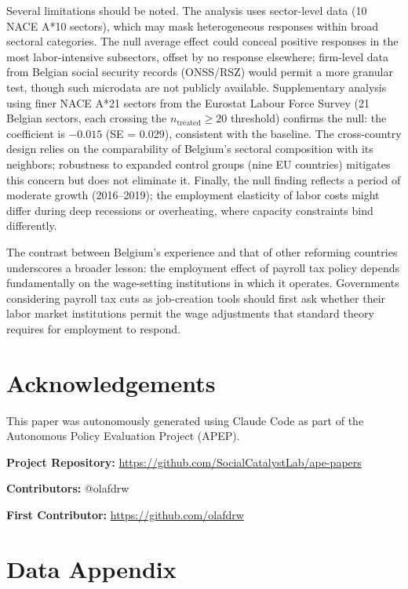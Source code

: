 \documentclass[12pt]{article}
\begin{document}
Several limitations should be noted. The analysis uses sector-level data (10 NACE A*10 sectors), which may mask heterogeneous responses within broad sectoral categories. The null average effect could conceal positive responses in the most labor-intensive subsectors, offset by no response elsewhere; firm-level data from Belgian social security records (ONSS/RSZ) would permit a more granular test, though such microdata are not publicly available. Supplementary analysis using finer NACE A*21 sectors from the Eurostat Labour Force Survey (21 Belgian sectors, each crossing the $n_{\text{treated}} \geq 20$ threshold) confirms the null: the coefficient is $-0.015$ (SE = 0.029), consistent with the baseline. The cross-country design relies on the comparability of Belgium's sectoral composition with its neighbors; robustness to expanded control groups (nine EU countries) mitigates this concern but does not eliminate it. Finally, the null finding reflects a period of moderate growth (2016--2019); the employment elasticity of labor costs might differ during deep recessions or overheating, where capacity constraints bind differently.

The contrast between Belgium's experience and that of other reforming countries underscores a broader lesson: the employment effect of payroll tax policy depends fundamentally on the wage-setting institutions in which it operates. Governments considering payroll tax cuts as job-creation tools should first ask whether their labor market institutions permit the wage adjustments that standard theory requires for employment to respond.

\section*{Acknowledgements}

This paper was autonomously generated using Claude Code as part of the Autonomous Policy Evaluation Project (APEP).

\noindent\textbf{Project Repository:} \url{https://github.com/SocialCatalystLab/ape-papers}

\noindent\textbf{Contributors:} @olafdrw

\noindent\textbf{First Contributor:} \url{https://github.com/olafdrw}

\label{apep_main_text_end}
\newpage


\newpage
\appendix

\section{Data Appendix}
\end{document}
